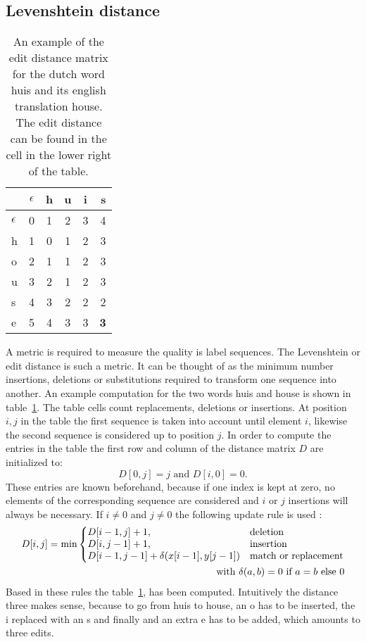 \subsection{Levenshtein distance}
\begin{table}
\centering
\begin{tabular}{ |l|c|c|c|c|r| } \hline
             & $\epsilon$ & h & u & i & s \\ \hline
$\epsilon$   & 0          & 1 & 2 & 3 & 4 \\ \hline
         h   & 1          & 0 & 1 & 2 & 3 \\ \hline
         o   & 2          & 1 & 1 & 2 & 3 \\ \hline
         u   & 3          & 2 & 1 & 2 & 3 \\ \hline
         s   & 4          & 3 & 2 & 2 & 2 \\ \hline
         e   & 5          & 4 & 3 & 3 & \textbf{3} \\ \hline
\end{tabular}
\caption{An example of the edit distance matrix for the dutch word huis and
its english translation house. The edit distance can be found in the cell
in the lower right of the table.}
\label{tab:editDistExample}
\end{table}
A metric is required to measure the quality is label sequences. The Levenshtein or edit distance is such a metric. It can be thought of as the minimum number insertions, deletions or substitutions required to transform one sequence into another.
An example computation for the two words huis and house is shown in table~\ref{tab:editDistExample}. The table cells count replacements, deletions or insertions. At position $i,j$ in the table the first sequence is taken into account until element $i$, likewise the second sequence is considered up to position $j$. In order to compute the entries in the table the first row and column of the distance matrix $D$ are initialized to:
\begin{equation}
D[0,j] = j \text{ and } D[i,0] = 0.
\end{equation}
These entries are known beforehand, because if one index is kept at zero,
no elements of the corresponding sequence are considered and $i$ or $j$ insertions will always be necessary.
If $i \neq 0$ and $j \neq 0$ the following update rule is used \cite[slide 10]{Langmead2016}:
\begin{align}
D[i,j] = \min\left\{
  \begin{array}{@{}ll@{}}
    D[i-1, j] + 1, & \text{deletion} \\
    D[i,j-1] + 1, & \text{insertion} \\
    D[i-1,j-1] + \delta(x[i-1], y[j-1]) & \text{match or replacement}
  \end{array}\right. \\
\text{with } \delta(a,b) = 0 \text{ if } a=b \text{ else } 0
\end{align}
Based in these rules the table~\ref{tab:editDistExample}, has been computed. Intuitively the distance three makes sense, because to go from huis to house, an o has to be inserted, the i replaced with an s and finally and an extra e has to be added, which amounts to three edits.


